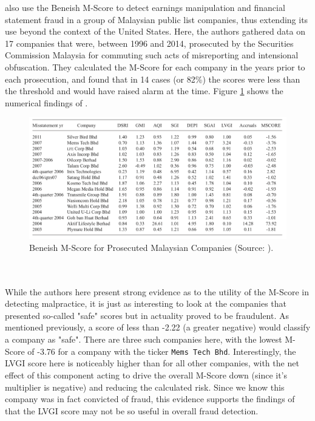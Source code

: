 {\cite{kamalDetection} also use the Beneish M-Score to detect earnings manipulation and financial statement fraud in a group of Malaysian public list companies, thus extending its use beyond the context of the United States. Here, the authors gathered data on 17 companies that were, between 1996 and 2014, prosecuted by the Securities Commission Malaysia for commuting such acts of misreporting and intensional obfuscation. They calculated the M-Score for each company in the years prior to each prosecution, and found that in 14 cases (or 82\%) the scores were less than the threshold and would have raised alarm at the time. Figure \ref{kamalBeneish} shows the numerical findings of \cite{kamalDetection}. 
\begin{figure}[h] 
\centering
\includegraphics[scale = 0.7, angle =90]{images/litReview/kamalBeneish.png}
\caption{Beneish M-Score for Prosecuted Malaysian Companies (Source: \cite{kamalDetection}).}
\label{kamalBeneish}
\end{figure}\\\\
While the authors here present strong evidence as to the utility of the M-Score in detecting malpractice, it is just as interesting to look at the companies that presented so-called "safe" scores but in actuality proved to be fraudulent. As mentioned previously, a score of less than -2.22 (a greater negative) would classify a company as "safe". There are three such companies here, with the lowest M-Score of -3.76 for a company with the ticker \texttt{Mems Tech Bhd}. Interestingly, the LVGI score here is noticeably higher than for all other companies, with the net effect of this component acting to drive the overall M-Score down (since it's multiplier is negative) and reducing the calculated risk. Since we know this company was in fact convicted of fraud, this evidence supports the findings of \cite{herawatiBeneish} that the LVGI score may not be so useful in overall fraud detection. }
\clearpage
